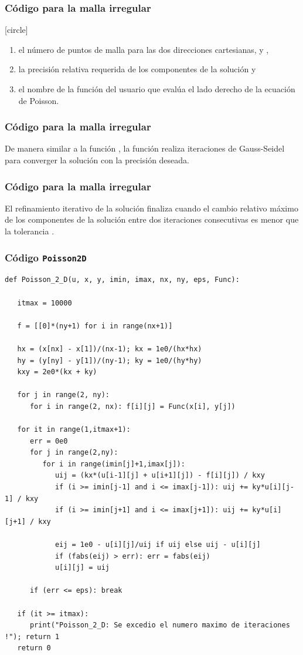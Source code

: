\begin{frame}
\frametitle{Código para la malla irregular}
[circle]
\begin{enumerate}[<+->]
\conti
\item el número de puntos de malla para las dos direcciones cartesianas,  y ,
\item la precisión relativa requerida de los componentes de la solución  y
\item el nombre de la función del usuario que evalúa el lado derecho de la ecuación de Poisson. 
\end{enumerate}
\end{frame}
\begin{frame}
\frametitle{Código para la malla irregular}
De manera similar a la función , la función  realiza iteraciones de Gauss-Seidel para converger la solución  con la precisión deseada.
\end{frame}
\begin{frame}
\frametitle{Código para la malla irregular}
El refinamiento iterativo de la solución finaliza cuando el cambio relativo máximo de los componentes de la solución entre dos iteraciones consecutivas es menor que la tolerancia .
\end{frame}
\begin{frame}
\frametitle{Código \texttt{Poisson2D}}
\begin{lstlisting}[caption=Código para resolver un dominio irregular, style=FormattedNumber, basicstyle=\linespread{1.1}\ttfamily=\small, columns=fullflexible]
def Poisson_2_D(u, x, y, imin, imax, nx, ny, eps, Func):

   itmax = 10000

   f = [[0]*(ny+1) for i in range(nx+1)]

   hx = (x[nx] - x[1])/(nx-1); kx = 1e0/(hx*hx)
   hy = (y[ny] - y[1])/(ny-1); ky = 1e0/(hy*hy) 
   kxy = 2e0*(kx + ky)

   for j in range(2, ny):
      for i in range(2, nx): f[i][j] = Func(x[i], y[j])

   for it in range(1,itmax+1):
      err = 0e0
      for j in range(2,ny):
         for i in range(imin[j]+1,imax[j]):
            uij = (kx*(u[i-1][j] + u[i+1][j]) - f[i][j]) / kxy
            if (i >= imin[j-1] and i <= imax[j-1]): uij += ky*u[i][j-1] / kxy
            if (i >= imin[j+1] and i <= imax[j+1]): uij += ky*u[i][j+1] / kxy

            eij = 1e0 - u[i][j]/uij if uij else uij - u[i][j]
            if (fabs(eij) > err): err = fabs(eij)
            u[i][j] = uij

      if (err <= eps): break

   if (it >= itmax):
      print("Poisson_2_D: Se excedio el numero maximo de iteraciones !"); return 1
   return 0
\end{lstlisting}
\end{frame}
